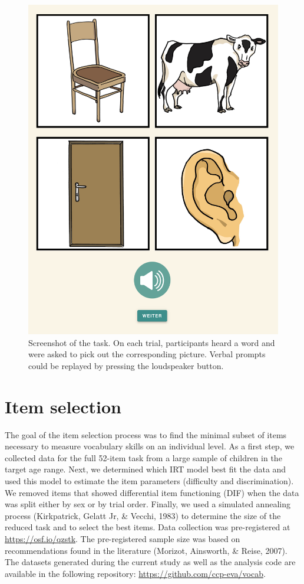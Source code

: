 \documentclass[
  man,floatsintext]{apa6}
\begin{document}
\begin{figure}

{\centering \includegraphics[width=0.5\linewidth]{../graphs/task_fig} 

}

\caption{Screenshot of the task. On each trial, participants heard a word and were asked to pick out the corresponding picture. Verbal prompts could be replayed by pressing the loudspeaker button.}\label{fig:fig1}
\end{figure}

\hypertarget{item-selection}{%
\section{Item selection}\label{item-selection}}

The goal of the item selection process was to find the minimal subset of items necessary to measure vocabulary skills on an individual level. As a first step, we collected data for the full 52-item task from a large sample of children in the target age range. Next, we determined which IRT model best fit the data and used this model to estimate the item parameters (difficulty and discrimination). We removed items that showed differential item functioning (DIF) when the data was split either by sex or by trial order. Finally, we used a simulated annealing process (Kirkpatrick, Gelatt Jr, \& Vecchi, 1983) to determine the size of the reduced task and to select the best items. Data collection was pre-registered at \url{https://osf.io/qzstk}. The pre-registered sample size was based on recommendations found in the literature (Morizot, Ainsworth, \& Reise, 2007). The datasets generated during the current study as well as the analysis code are available in the following repository: \url{https://github.com/ccp-eva/vocab}.
\end{document}
